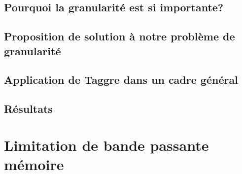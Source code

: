 \documentclass[twoside,10pt]{classes/Thesis}
\begin{document}
\section{Pourquoi la granularité est si importante?}




\section{Proposition de solution à notre problème de granularité}









\section{Application de Taggre dans un cadre général}









\section{Résultats}









\chapter{Limitation de bande passante mémoire}
\minitoc
\vspace{1cm}
\end{document}
